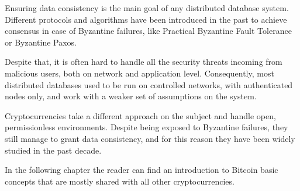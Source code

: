 Ensuring data consistency is the main goal of any distributed database system. Different protocols and algorithms have been introduced in the past to achieve consensus in case of Byzantine failures, like Practical Byzantine Fault Tolerance or Byzantine Paxos.

Despite that, it is often hard to handle all the security threats incoming from malicious users, both on network and application level. Consequently, most distributed databases used to be run on controlled networks, with authenticated nodes only, and work with a weaker set of assumptions on the system.

Cryptocurrencies take a different approach on the subject and handle open, permissionless environments. Despite being exposed to Byzantine failures, they still manage to grant data consistency, and for this reason they have been widely studied in the past decade.

In the following chapter the reader can find an introduction to Bitcoin basic concepts that are mostly shared with all other cryptocurrencies.

